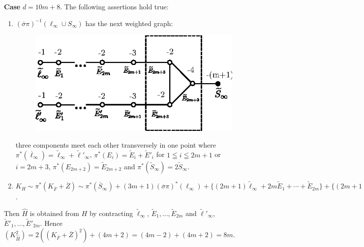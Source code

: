 \subsubsection{}\label{chap3:3.6.7}
{\bf Case} $d=10m+8$. The following assertions hold true:
\begin{enumerate}
\renewcommand{\labelenumi}{(\theenumi)}
\item $(\overline{\sigma}\pi)^{-1}(\ell_{\infty}\cup S_{\infty})$ has
  the next weighted graph:
\begin{figure}[H]
\centering
\includegraphics[scale=1.3]{figures/miyansi_fig50.eps}
\end{figure}
\noindent
three components meet each other transversely in one point where
$\pi^{\ast}(\overline{\ell}_{\infty})=\widetilde{\ell}_{\infty}+\widetilde{\ell}'_{\infty}$,
$\pi^{\ast}(E_{i})=\widetilde{E}_{i}+\widetilde{E}'_{i}$ for $1\leqq
i\leqq 2m+1$ or $i=2m+3$, $\pi^{\ast}(E_{2m+2})=\widetilde{E}_{2m+2}$
and $\pi^{\ast}(\widetilde{S}_{\infty})=2\widetilde{S}_{\infty}$. 

\item $K_{H}\sim
  \pi^{\ast}(K_{\overline{F}}+\overline{Z})\sim\pi^{\ast}(\overline{S}_{\infty})+(3m+1)(\overline{\sigma}\pi)^{\ast}(\ell_{\infty})+\{(2m+1)\widetilde{\ell}_{\infty}+2m\widetilde{E}_{1}+\cdots+\widetilde{E}_{2m}\}+\{(2m+1)\widetilde{\ell}'_{\infty}+2m\widetilde{E}'_{i}+\cdots+\widetilde{E}'_{2m}\}$. 
\end{enumerate}

Then $\widehat{H}$ is obtained from $H$ by contracting
$\widetilde{\ell}_{\infty}$,
$\widetilde{E}_{1},\ldots,\widetilde{E}_{2m}$ and
$\widetilde{\ell}'_{\infty}$,
$\widetilde{E}'_{1},\ldots,\widetilde{E}'_{2m}$. Hence
$(K^{2}_{\widehat{H}})=2((K_{\overline{F}}+\overline{Z})^{2})+(4m+2)=(4m-2)+(4m+2)=8m$. 

